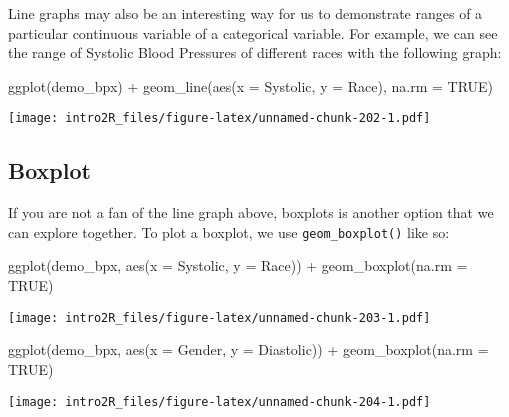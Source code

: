 \documentclass[
]{book}
\newenvironment{Shaded}{\begin{snugshade}}{\end{snugshade}}
\newcommand{\AttributeTok}[1]{\textcolor[rgb]{0.77,0.63,0.00}{#1}}
\newcommand{\ConstantTok}[1]{\textcolor[rgb]{0.00,0.00,0.00}{#1}}
\newcommand{\FunctionTok}[1]{\textcolor[rgb]{0.00,0.00,0.00}{#1}}
\newcommand{\NormalTok}[1]{#1}
\newcommand{\SpecialCharTok}[1]{\textcolor[rgb]{0.00,0.00,0.00}{#1}}
\begin{document}
Line graphs may also be an interesting way for us to demonstrate ranges of a particular continuous variable of a categorical variable. For example, we can see the range of Systolic Blood Pressures of different races with the following graph:

\begin{Shaded}
\begin{Highlighting}[]
\FunctionTok{ggplot}\NormalTok{(demo\_bpx) }\SpecialCharTok{+} 
    \FunctionTok{geom\_line}\NormalTok{(}\FunctionTok{aes}\NormalTok{(}\AttributeTok{x =}\NormalTok{ Systolic, }\AttributeTok{y =}\NormalTok{ Race), }\AttributeTok{na.rm =} \ConstantTok{TRUE}\NormalTok{)}
\end{Highlighting}
\end{Shaded}

\texttt{[image: intro2R\_files/figure-latex/unnamed-chunk-202-1.pdf]}

\hypertarget{boxplot}{%
\subsection{Boxplot}\label{boxplot}}

If you are not a fan of the line graph above, boxplots is another option that we can explore together. To plot a boxplot, we use \texttt{geom\_boxplot()} like so:

\begin{Shaded}
\begin{Highlighting}[]
\FunctionTok{ggplot}\NormalTok{(demo\_bpx, }\FunctionTok{aes}\NormalTok{(}\AttributeTok{x =}\NormalTok{ Systolic, }\AttributeTok{y =}\NormalTok{ Race)) }\SpecialCharTok{+}
  \FunctionTok{geom\_boxplot}\NormalTok{(}\AttributeTok{na.rm =} \ConstantTok{TRUE}\NormalTok{)}
\end{Highlighting}
\end{Shaded}

\texttt{[image: intro2R\_files/figure-latex/unnamed-chunk-203-1.pdf]}

\begin{Shaded}
\begin{Highlighting}[]
\FunctionTok{ggplot}\NormalTok{(demo\_bpx, }\FunctionTok{aes}\NormalTok{(}\AttributeTok{x =}\NormalTok{ Gender, }\AttributeTok{y =}\NormalTok{ Diastolic)) }\SpecialCharTok{+}
  \FunctionTok{geom\_boxplot}\NormalTok{(}\AttributeTok{na.rm =} \ConstantTok{TRUE}\NormalTok{)}
\end{Highlighting}
\end{Shaded}

\texttt{[image: intro2R\_files/figure-latex/unnamed-chunk-204-1.pdf]}
\end{document}
